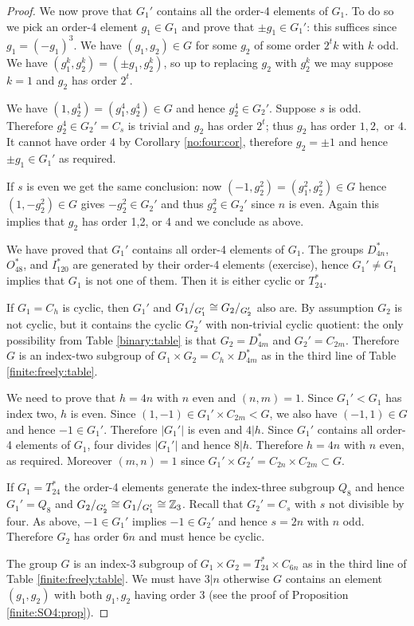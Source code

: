 \begin{proof}
We now prove that $G_1'$ contains all the order-4 elements of $G_1$.
To do so we pick an order-4 element $g_1 \in G_1$ and prove that $\pm g_1 \in G_1'$: this suffices since $g_1 = (-g_1)^3$. We have $(g_1,g_2) \in G$ for some $g_2$ of some order $2^tk$ with $k$ odd. We have $(g_1^k,g_2^k) = (\pm g_1, g_2^k)$, so up to replacing $g_2$ with $g_2^k$ we may suppose $k=1$ and $g_2$ has order $2^t$. 

We have $(1,g_2^4) = (g_1^4,g_2^4) \in G$ and hence $g_2^4 \in G_2'$. Suppose $s$ is odd. Therefore $g_2^4 \in G_2' = C_s$ is trivial and $g_2$ has order $2^t$; thus $g_2$ has order $1,2,$ or $4$. It cannot have order $4$ by Corollary \ref{no:four:cor}, therefore $g_2= \pm 1$ and hence $\pm g_1 \in G_1'$ as required.

If $s$ is even we get the same conclusion: now $(-1,g_2^2) = (g_1^2,g_2^2) \in G$ hence $(1,-g_2^2) \in G$ gives $-g_2^2 \in G_2'$ and thus $g_2^2 \in G_2'$ since $n$ is even. Again this implies that $g_2$ has order 1,2, or 4 and we conclude as above.

We have proved that $G_1'$ contains all order-4 elements of $G_1$. The groups $D_{4n}^*$, $O_{48}^*$, and $I_{120}^*$ are generated by their order-4 elements (exercise), hence $G_1' \neq G_1$ implies that $G_1$ is not one of them. Then it is either cyclic or $T_{24}^*$.

If $G_1= C_h$ is cyclic, then $G_1'$ and $G_1/_{G_1'} \cong G_2/_{G_2'}$ also are. By assumption $G_2$ is not cyclic, but it contains the cyclic $G_2'$ with non-trivial cyclic quotient: the only possibility from Table \ref{binary:table} is that $G_2 = D_{4m}^*$ and $G_2' = C_{2m}$. Therefore $G$ is an index-two subgroup of $G_1\times G_2 = C_h \times D_{4m}^* $ as in the third line of Table \ref{finite:freely:table}. 

We need to prove that $h=4n$ with $n$ even and $(n,m)=1$. Since $G_1' < G_1$ has index two, $h$ is even. Since $(1,-1) \in G_1' \times C_{2m}< G$, we also have $(-1,1)\in G$ and hence $-1\in G_1'$. Therefore $|G_1'|$ is even and $4|h$. Since $G_1'$ contains all order-4 elements of $G_1$, four divides $|G_1'|$ and hence $8|h$. Therefore $h=4n$ with $n$ even, as required.
Moreover $(m,n)=1$ since $G_1' \times G_2' = C_{2n} \times C_{2m} \subset G$.

If $G_1 = T_{24}^*$ the order-4 elements generate the index-three subgroup $Q_8$ and hence $G_1' = Q_8$ and $G_2/_{G_2'} \cong G_1/_{G_1'} \cong \mathbb{Z}_3$. Recall that $G_2' = C_s$ with $s$ not divisible by four. As above, $-1 \in G_1'$ implies $-1 \in G_2'$ and hence $s = 2n$ with $n$ odd. Therefore $G_2$ has order $6n$ and must hence be cyclic. 

The group $G$ is an index-3 subgroup of $G_1\times G_2 = T_{24}^* \times C_{6n} $ as in the third line of Table \ref{finite:freely:table}. We must have $3|n$ otherwise $G$ contains an element $(g_1,g_2)$ with both $g_1,g_2$ having order 3 (see the proof of Proposition \ref{finite:SO4:prop}).
\end{proof}

